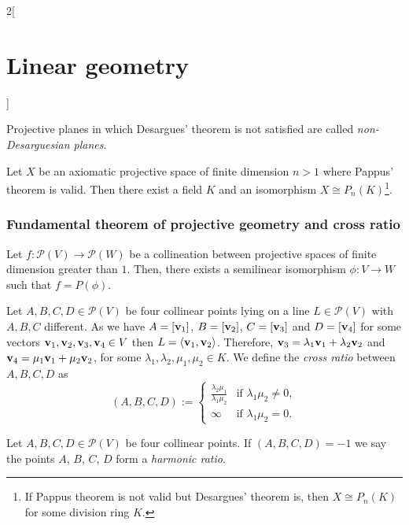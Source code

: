 \documentclass[../../../main.tex]{subfiles}
\begin{document}
\begin{multicols}{2}[\section{Linear geometry}]
\begin{definition}
\begin{itemize}
    \end{itemize}
  \end{definition}
  \begin{definition}
    Projective planes in which Desargues' theorem is not satisfied are called \emph{non-Desarguesian planes}.
  \end{definition}
  \begin{theorem}
    Let $X$ be an axiomatic projective space of finite dimension $n>1$ where Pappus' theorem is valid. Then there exist a field $K$ and an isomorphism $X\cong P_n(K)$\footnote{If Pappus theorem is not valid but Desargues' theorem is, then $X\cong P_n(K)$ for some division ring $K$.}.
  \end{theorem}
  \subsubsection{Fundamental theorem of projective geometry and cross ratio}
  \begin{theorem}
    Let $f:\mathcal{P}(V)\rightarrow \mathcal{P}(W)$ be a collineation between projective spaces of finite dimension greater than $1$. Then, there exists a semilinear isomorphism $\phi:V\rightarrow W$ such that $f=P(\phi)$.
  \end{theorem}
  \begin{definition}
    Let $A,B,C,D\in\mathcal{P}(V)$ be four collinear points lying on a line $L\in\mathcal{P}(V)$ with $A,B,C$ different. As we have $A=[\boldsymbol{\mathrm{v}}_1]$, $B=[\boldsymbol{\mathrm{v}}_2]$, $C=[\boldsymbol{\mathrm{v}}_3]$ and $D=[\boldsymbol{\mathrm{v}}_4]$ for some vectors $\boldsymbol{\mathrm{v}}_1,\boldsymbol{\mathrm{v}}_2,\boldsymbol{\mathrm{v}}_3,\boldsymbol{\mathrm{v}}_4\in V$ then $L=\langle \boldsymbol{\mathrm{v}}_1,\boldsymbol{\mathrm{v}}_2\rangle$. Therefore, $\boldsymbol{\mathrm{v}}_3=\lambda_1\boldsymbol{\mathrm{v}}_1+\lambda_2\boldsymbol{\mathrm{v}}_2$ and $\boldsymbol{\mathrm{v}}_4=\mu_1\boldsymbol{\mathrm{v}}_1+\mu_2\boldsymbol{\mathrm{v}}_2$, for some $\lambda_1,\lambda_2,\mu_1,\mu_2\in K$. We define the \emph{cross ratio} between $A,B,C,D$ as $$(A,B,C,D):=
      \begin{cases}
        \displaystyle\frac{\lambda_2\mu_1}{\lambda_1\mu_2} & \text{if }\lambda_1\mu_2\ne0, \\
        \infty                                             & \text{if }\lambda_1\mu_2=0.
      \end{cases}$$
  \end{definition}
  \begin{definition}
    Let $A,B,C,D\in\mathcal{P}(V)$ be four collinear points. If $(A,B,C,D)=-1$ we say the points $A$, $B$, $C$, $D$ form a \emph{harmonic ratio}.
  \end{definition}

\end{multicols}
\end{document}
